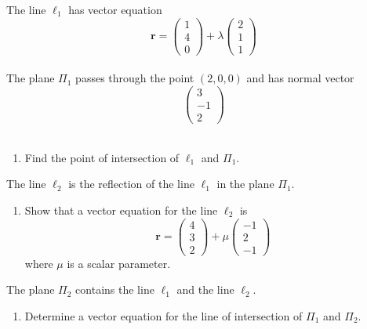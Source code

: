 \documentclass[leqno]{article}
\begin{document}
\begin{enumerate}[
  label=\textbf{\arabic*.},
  leftmargin=*,
  topsep=0pt,
  partopsep=0pt,
  parsep=0pt
]
The line $\ell_1$ has vector equation
\[
\mathbf{r}=\begin{pmatrix}1\\4\\0\end{pmatrix}+\lambda\begin{pmatrix}2\\1\\1\end{pmatrix}
\] \\
The plane $\Pi_1$ passes through the point $(2,0,0)$ and has normal vector
\[
\begin{pmatrix}3\\-1\\2\end{pmatrix}
\] \\
\begin{enumerate}[label=\textbf{(\alph*)}]
  \item Find the point of intersection of $\ell_1$ and $\Pi_1$.  \\
\end{enumerate}
The line $\ell_2$ is the reflection of the line $\ell_1$ in the plane $\Pi_1$. \\
\begin{enumerate}[label=\textbf{(\alph*)}, resume]
  \item Show that a vector equation for the line $\ell_2$ is
  \[
  \mathbf{r}=\begin{pmatrix}4\\3\\2\end{pmatrix}+\mu\begin{pmatrix}-1\\2\\-1\end{pmatrix}
  \]
  where $\mu$ is a scalar parameter. \\
\end{enumerate}
The plane $\Pi_2$ contains the line $\ell_1$ and the line $\ell_2$. \\
\begin{enumerate}[label=\textbf{(\alph*)}, resume]
  \item Determine a vector equation for the line of intersection of $\Pi_1$ and $\Pi_2$.  \\
\end{enumerate}

\vspace*{10pt}


\end{enumerate}
\end{document}
